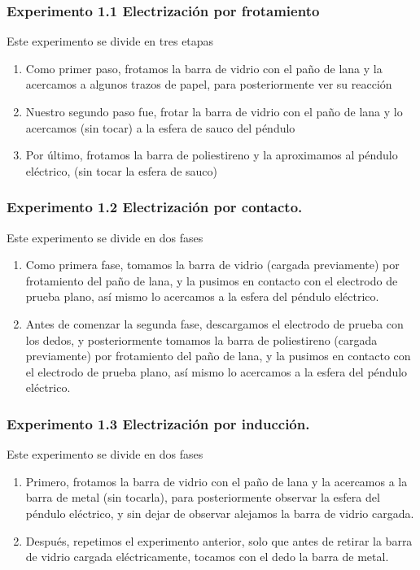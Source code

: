 \documentclass[10pt]{article}
\begin{document}
\begin{multicols}{2}
	\subsubsection {Experimento 1.1 Electrización por frotamiento}
	Este experimento se divide en tres etapas
	\begin{enumerate}
		\item Como primer paso, frotamos la barra de vidrio con el paño de lana y la acercamos a algunos trazos de papel, para posteriormente ver su reacción
		\item Nuestro segundo paso fue, frotar la barra de vidrio con el paño de lana y lo acercamos (sin tocar) a la esfera de sauco del péndulo
		\item Por último, frotamos la barra de poliestireno y la aproximamos al péndulo eléctrico, (sin tocar la esfera de sauco)
	\end{enumerate}
	\subsubsection{Experimento 1.2 Electrización por contacto.}
	Este experimento se divide en dos fases
	\begin{enumerate}
		\item Como primera fase, tomamos la barra de vidrio (cargada previamente) por frotamiento del paño de lana, y la pusimos en contacto con el electrodo de prueba plano, así mismo lo acercamos a la esfera del péndulo eléctrico.
		\item Antes de comenzar la segunda fase, descargamos el electrodo de prueba con los dedos, y posteriormente tomamos la barra de poliestireno (cargada previamente) por frotamiento del paño de lana, y la pusimos en contacto con el electrodo de prueba plano, así mismo lo acercamos a la esfera del péndulo eléctrico.
	\end{enumerate}
	\subsubsection{Experimento 1.3 Electrización por inducción.}
	Este experimento se divide en dos fases
	\begin{enumerate}
		\item Primero, frotamos la barra de vidrio con el paño de lana y la acercamos a la barra de metal (sin tocarla), para posteriormente observar la esfera del péndulo eléctrico, y sin dejar de observar alejamos la barra de vidrio cargada.
		\item Después, repetimos el experimento anterior, solo que antes de retirar la barra de vidrio cargada eléctricamente, tocamos con el dedo la barra de metal.
	\end{enumerate}

\end{multicols}
\end{document}
